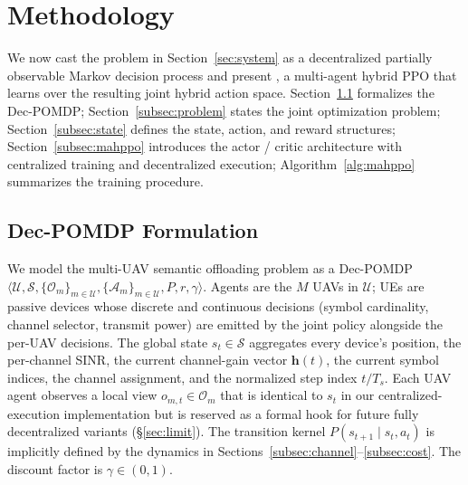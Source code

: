 \section{Methodology}\label{sec:method}

We now cast the problem in Section~\ref{sec:system} as a decentralized
partially observable Markov decision process and present \method, a
multi-agent hybrid PPO that learns over the resulting joint hybrid
action space. Section~\ref{subsec:dec-pomdp} formalizes the Dec-POMDP;
Section~\ref{subsec:problem} states the joint optimization problem;
Section~\ref{subsec:state} defines the state, action, and reward
structures; Section~\ref{subsec:mahppo} introduces
the actor / critic architecture with centralized training and
decentralized execution; Algorithm~\ref{alg:mahppo} summarizes the
training procedure.

\subsection{Dec-POMDP Formulation}\label{subsec:dec-pomdp}
We model the multi-UAV semantic offloading problem as a Dec-POMDP
$\langle\mathcal{U},\mathcal{S},\{\mathcal{O}_m\}_{m\in\mathcal{U}},
\{\mathcal{A}_m\}_{m\in\mathcal{U}},P,r,\gamma\rangle$. Agents are the
$M$ UAVs in $\mathcal{U}$; UEs are passive devices whose discrete and
continuous decisions (symbol cardinality, channel selector, transmit
power) are emitted by the joint policy alongside the per-UAV decisions.
The global state $s_t\in\mathcal{S}$ aggregates every device's position,
the per-channel SINR, the current channel-gain vector
$\boldsymbol{h}(t)$, the current symbol indices, the channel
assignment, and the normalized step index $t/T_s$. Each UAV agent
observes a local view $o_{m,t}\in\mathcal{O}_m$ that is identical to
$s_t$ in our centralized-execution implementation but is reserved as a
formal hook for future fully decentralized variants
(\S\ref{sec:limit}). The transition kernel $P(s_{t+1}\mid s_t,a_t)$ is
implicitly defined by the dynamics in
Sections~\ref{subsec:channel}--\ref{subsec:cost}. The discount factor
is $\gamma\in(0,1)$.

